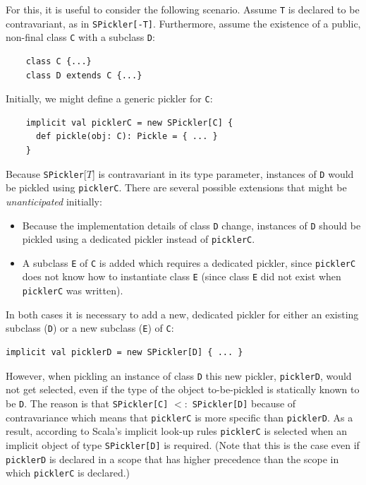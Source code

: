 \documentclass[10pt]{sigplanconf}
\theoremstyle{definition}
\theoremstyle{definition}
\newcommand{\term}[1]{\mbox{\texttt{#1}}}
\begin{document}
For this, it is useful to consider the following scenario. Assume \term{T} is
declared to be contravariant, as in \term{SPickler[-T]}. Furthermore, assume
the existence of a public, non-final class \term{C} with a subclass \term{D}:

\begin{lstlisting}
    class C {...}
    class D extends C {...}
\end{lstlisting}

Initially, we might define a generic pickler for \term{C}:

\pagebreak

\begin{lstlisting}
    implicit val picklerC = new SPickler[C] {
      def pickle(obj: C): Pickle = { ... }
    }
\end{lstlisting}

Because \term{SPickler}[$T$] is contravariant in its type parameter, instances
of \term{D} would be pickled using \term{picklerC}. There are several possible
extensions that might be {\em unanticipated} initially:

\begin{itemize}
\item Because the implementation details of class \term{D} change, instances
of \term{D} should be pickled using a dedicated pickler instead of
\term{picklerC}.

\item A subclass \term{E} of \term{C} is added which requires a dedicated
pickler, since \term{picklerC} does not know how to instantiate class \term{E}
(since class \term{E} did not exist when \term{picklerC} was written).
\end{itemize}

In both cases it is necessary to add a new, dedicated pickler for either an
existing subclass (\term{D}) or a new subclass (\term{E}) of \term{C}:

\begin{lstlisting}
implicit val picklerD = new SPickler[D] { ... }
\end{lstlisting}

However, when pickling an instance of class \term{D} this new pickler,
\term{picklerD}, would not get selected, even if the type of the object to-be-pickled
is statically known to be \term{D}. The reason is that
\term{SPickler[C]} $<:$ \term{SPickler[D]} because of contravariance which
means that \term{picklerC} is more specific than \term{picklerD}. As a result,
according to Scala's implicit look-up rules \term{picklerC} is selected when
an implicit object of type \term{SPickler[D]} is required. (Note that this
is the case even if \term{picklerD} is declared in a scope that has higher
precedence than the scope in which \term{picklerC} is declared.)
\end{document}
